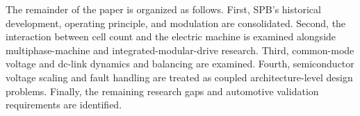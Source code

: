 The remainder of the paper is organized as follows. First, SPB's
historical development, operating principle, and modulation are
consolidated. Second, the interaction between cell count and the
electric machine is examined alongside multiphase-machine and
integrated-modular-drive research. Third, common-mode voltage and
dc-link dynamics and balancing are examined. Fourth, semiconductor
voltage scaling and fault handling are treated as coupled
architecture-level design problems. Finally, the remaining research
gaps and automotive validation requirements are identified.